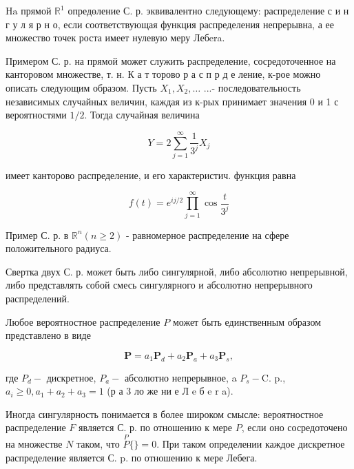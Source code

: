 \documentclass[10pt]{article}
\begin{document}
$\mathrm{Ha}$ прямой $\mathbb{R}^{1}$ опредөление С. р. эквивалентно следующему: распределение с и н г у л я р н о, если соответствующая функция распределения непрерывна, а ее множество точек роста имеет нулевую меру Лебera.



Примером С. р. на прямой может служить распределение, сосредоточенное на канторовом множестве, т. н. К а т торово р а с п р д е ление, к-рое можно описать следующим образом. Пусть $X_{1}, X_{2}, \ldots$ ...- последовательность независимых случайных величин, каждая из к-рых принимает значения 0 и 1 с вероятностями $1 / 2$. Тогда случайная величина



\[

Y=2 \sum_{j=1}^{\infty} \frac{1}{3^{j}} X_{j}

\]



имеет канторово распределение, и его характеристич. функция равна



\[

f(t)=e^{i j / 2} \prod_{j=1}^{\infty} \cos \frac{t}{3^{j}}

\]



Пример С. р. в $\mathbb{R}^{n}(n \geqslant 2)$ - равномерное распределение на сфере положительного радиуса.



Свертка двух С. р. может быть либо сингулярной, либо абсолютно непрерывной, либо представлять собой смесь сингулярного и абсолютно непрерывного распределений.



Любое вероятностное распределение $P$ может быть единственным образом представлено в виде



\[

\boldsymbol{P}=a_{1} \boldsymbol{P}_{d}+a_{2} \boldsymbol{P}_{a}+a_{3} \boldsymbol{P}_{s},

\]



где $P_{d}-$ дискретное, $P_{a}-$ абсолютно непрерывное, a $P_{s}-\mathrm{C}$. p., $a_{i} \geqslant 0, a_{1}+a_{2}+a_{3}=1$ (р а 3 ло же ни е Л e б e r a).



Иногда сингулярность понимается в более широком смысле: вероятностное распределение $F$ является С. р. по отношению к мере $P$, если оно сосредоточено на множестве $N$ таком, что $\stackrel{P}{P}\{\}=0$. При таком определении каждое дискретное распределение является С. p. по отношению к мере Лебега.
\end{document}
